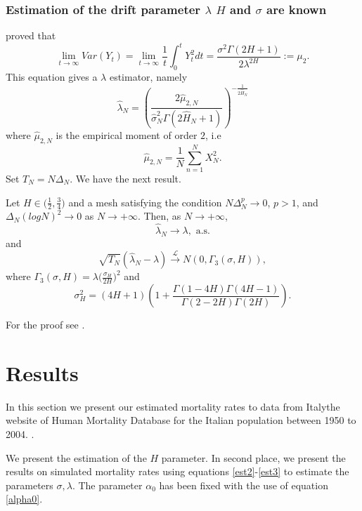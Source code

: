 \documentclass[smallextended]{svjour3}
\begin{document}
    \subsubsection{Estimation of the drift parameter $\lambda$  $H$ and
                $\sigma$ are known}
    \citet{hu-nu} proved that
    \[
        \lim_{t\rightarrow \infty} Var (Y_t)= \lim_{t\rightarrow \infty}
        \frac{1}{t}\int_0^t Y_t^2 dt = \frac{\sigma^2 \Gamma(2H+1) }
        {2\lambda^{2H}}:=\mu_2.
    \]
    This equation gives a $\lambda$ estimator, namely
    \begin{equation} \label{est3}
        \hat{\lambda}_N = 
            \left(
                \dfrac{ 2\hat{\mu}_{2,N} }{ 
                    \hat{\sigma}_N^2 
                    \Gamma(2\hat{H}_N+1)
                }
            \right) ^ {-\tfrac{1}{2\hat{H}_N}}
    \end{equation}
    where $\hat{\mu}_{2,N}$ is the empirical moment of order $2$, i.e
    \[
        \hat{\mu}_{2,N} =
            \dfrac{1}{N}
            \sum_{n=1}^N X_N^2.
    \]
    Set $T_N=N\Delta_N$. We have the next result.
    \begin{theorem}
        Let $H \in \big(\tfrac{1}{2} , \tfrac{3}{4}\big)$ and a mesh satisfying 
        the condition $N \Delta_N^p\rightarrow 0$, $p>1$,
        and $ \Delta_N (log N )^2 \rightarrow 0$ as $N \rightarrow +\infty$. 
        Then,
        as $N \rightarrow +\infty$,
        \[
            \hat{\lambda}_N {\to}  \lambda, \text{ a.s.}
        \]
        and
        \[
            \sqrt{T_N} ( \hat{\lambda}_N -\lambda)
            \stackrel{\mathcal{L}}{\longrightarrow} N (0, \Gamma_3 (\sigma,H)),
        \]
        where 
        $\Gamma_3 (\sigma,H)=\lambda \big(\tfrac{\sigma_H}{2H} \big)^2$ and
        \[
            \sigma_H^2= (4H+1)
            \left(
                1+
                \frac{\Gamma(1-4H)\Gamma(4H-1)}{\Gamma(2-2H)\Gamma(2H)} 
            \right).
        \]
    \end{theorem}
    For the proof see \citep[][Thm. 2]{br-ia}.

\section{Results} \label{re-fou}
        In this section we present our estimated mortality rates to  
    data from Italy\textemdash the website of Human Mortality Database for 
    the Italian population between \num{1950} to \num{2004}.
.

        We present the estimation of the $H$ parameter. 
    In second place, we present the results on simulated mortality rates using  
    equations \eqref{est2}-\eqref{est3} to estimate the parameters 
    $\sigma,\lambda$. The parameter $\alpha_0$ has been fixed with the use of 
    equation \eqref{alpha0}.
\end{document}
